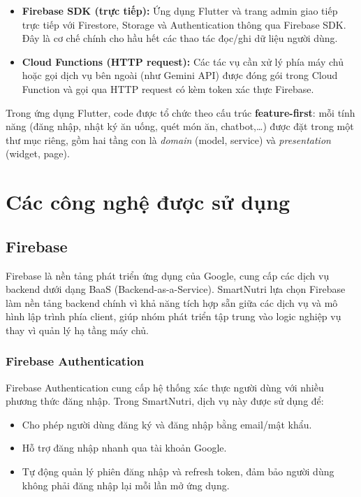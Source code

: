 \begin{itemize}
    \item \textbf{Firebase SDK (trực tiếp):} Ứng dụng Flutter và trang admin giao tiếp trực tiếp với Firestore, Storage và Authentication thông qua Firebase SDK. Đây là cơ chế chính cho hầu hết các thao tác đọc/ghi dữ liệu người dùng.
    \item \textbf{Cloud Functions (HTTP request):} Các tác vụ cần xử lý phía máy chủ hoặc gọi dịch vụ bên ngoài (như Gemini API) được đóng gói trong Cloud Function và gọi qua HTTP request có kèm token xác thực Firebase.
\end{itemize}

Trong ứng dụng Flutter, code được tổ chức theo cấu trúc \textbf{feature-first}: mỗi tính năng (đăng nhập, nhật ký ăn uống, quét món ăn, chatbot,\ldots) được đặt trong một thư mục riêng, gồm hai tầng con là \textit{domain} (model, service) và \textit{presentation} (widget, page).

\section{Các công nghệ được sử dụng}

\subsection{Firebase}

Firebase là nền tảng phát triển ứng dụng của Google, cung cấp các dịch vụ backend dưới dạng BaaS (Backend-as-a-Service). SmartNutri lựa chọn Firebase làm nền tảng backend chính vì khả năng tích hợp sẵn giữa các dịch vụ và mô hình lập trình phía client, giúp nhóm phát triển tập trung vào logic nghiệp vụ thay vì quản lý hạ tầng máy chủ.

\subsubsection{Firebase Authentication}

Firebase Authentication \cite{firebase_auth} cung cấp hệ thống xác thực người dùng với nhiều phương thức đăng nhập. Trong SmartNutri, dịch vụ này được sử dụng để:

\begin{itemize}
    \item Cho phép người dùng đăng ký và đăng nhập bằng email/mật khẩu.
    \item Hỗ trợ đăng nhập nhanh qua tài khoản Google.
    \item Tự động quản lý phiên đăng nhập và refresh token, đảm bảo người dùng không phải đăng nhập lại mỗi lần mở ứng dụng.
\end{itemize}

